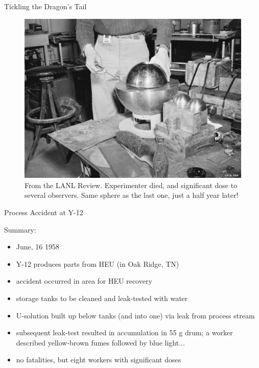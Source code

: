 \documentclass[10pt]{beamer}
\begin{document}
\begin{frame}{Tickling the Dragon's Tail}

  \begin{figure}
    \includegraphics[keepaspectratio, width = 3.2 in]{images/pu_sphere_2}
    \caption{From the LANL Review.  Experimenter died, and significant dose
             to several observers.  Same sphere as the last one, just a half 
             year later!}
  \end{figure}

\end{frame}

\begin{frame}{Process Accident at Y-12}

Summary:
\begin{itemize}
 \item June, 16 1958
 \item Y-12 produces parts from HEU (in Oak Ridge, TN)
 \item accident occurred in area for HEU recovery
 \item storage tanks to be cleaned and leak-tested with water
 \item U-solution built up below tanks (and into one) via leak from process 
       stream
 \item subsequent leak-test resulted in accumulation in 55 g drum; a worker 
       described yellow-brown fumes followed by blue light...
 \item no fatalities, but eight workers with significant doses
\end{itemize}

\end{frame}
\end{document}
